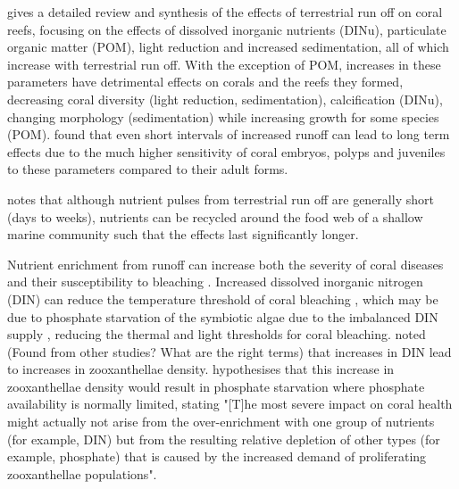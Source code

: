 \documentclass[11pt,a4paper]{article}
\begin{document}
\cite{Fabricius2005} gives a detailed review and synthesis of the effects of terrestrial run off on coral reefs, focusing on the effects of dissolved inorganic nutrients (DINu), particulate organic matter (POM), light reduction and increased sedimentation, all of which increase with terrestrial run off. With the exception of POM, increases in these parameters have detrimental effects on corals and the reefs they formed, decreasing coral diversity (light reduction, sedimentation), calcification (DINu), changing morphology (sedimentation) while increasing growth for some species (POM). \cite{Fabricius2005} found that even short intervals of increased runoff can lead to long term effects due to the much higher sensitivity of coral embryos, polyps and juveniles to these parameters compared to their adult forms. 

\cite{Wooldridge2009} notes that although nutrient pulses from terrestrial run off are generally short (days to weeks), nutrients can be recycled around the food web of a shallow marine community such that the effects last significantly longer.


Nutrient enrichment from runoff can increase both the severity of coral diseases \citep{Bruno2003} and their susceptibility to bleaching \citep{Wiedenmann2013}. Increased dissolved inorganic nitrogen (DIN) can reduce the temperature threshold of coral bleaching \citep{Wooldridge2009}, which may be due to phosphate starvation of the symbiotic algae due to the imbalanced DIN supply \citep{Wiedenmann2013}, reducing the thermal and light thresholds for coral bleaching. \cite{Fabricius2005} noted (Found from other studies? What are the right terms) that increases in DIN lead to increases in zooxanthellae density. \cite{Wiedemann2013} hypothesises that this increase in zooxanthellae density would result in phosphate starvation where phosphate availability is normally limited, stating "[T]he most severe impact on coral health might actually not arise from the over-enrichment with one group of nutrients (for example, DIN) but from the resulting relative depletion of other types (for example, phosphate) that is caused by the increased demand of proliferating zooxanthellae populations".
\end{document}

